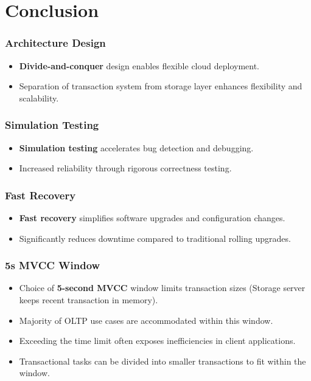 \section{Conclusion}

\begin{frame}
    \frametitle{Architecture Design}
    \begin{itemize}
        \item \textbf{Divide-and-conquer} design enables flexible cloud deployment.
        \item Separation of transaction system from storage layer enhances flexibility and scalability.
    \end{itemize}
\end{frame}
\begin{frame}
    \frametitle{Simulation Testing}
    \begin{itemize}
        \item \textbf{Simulation testing} accelerates bug detection and debugging.
        \item Increased reliability through rigorous correctness testing.
    \end{itemize}
\end{frame}
\begin{frame}
    \frametitle{Fast Recovery}
    \begin{itemize}
        \item \textbf{Fast recovery} simplifies software upgrades and configuration changes.
        \item Significantly reduces downtime compared to traditional rolling upgrades.
    \end{itemize}
\end{frame}
\begin{frame}
    \frametitle{5s MVCC Window}
    \begin{itemize}
        \item Choice of \textbf{5-second MVCC} window limits transaction sizes (Storage server keeps recent transaction in memory).
        \item Majority of OLTP use cases are accommodated within this window.
        \item Exceeding the time limit often exposes inefficiencies in client applications.
        \item Transactional tasks can be divided into smaller transactions to fit within the window.
    \end{itemize}
\end{frame}
